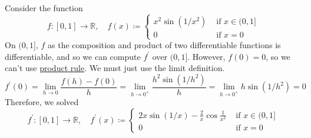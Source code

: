   \begin{example}
    \label{ex:wiggly-sine}
    Consider the function 
    \begin{equation}
      f: [0, 1] \to \mathbb{R}, \quad f(x) \coloneqq \begin{cases} 
        x^2 \sin (1/x^2) & \text{ if } x \in (0, 1] \\
        0 & \text{ if } x = 0
      \end{cases}
    \end{equation}
    On $(0, 1]$, $f$ as the composition and product of two differentiable functions is differentiable, and so we can compute $f^\prime$ over $(0, 1]$. However, $f(0) = 0$, so we can't use \hyperref[thm:product_rule]{product rule}. We must just use the limit definition. 
    \begin{equation}
      f^\prime (0) = \lim_{h \to 0} \frac{f(h) - f(0)}{h} = \lim_{h \to 0^+} \frac{h^2 \sin(1/h^2)}{h} = \lim_{h \to 0^+} h \sin(1/h^2) = 0
    \end{equation}
    Therefore, we solved 
    \begin{equation}
      f^\prime : [0, 1] \to \mathbb{R}, \quad f^\prime (x) \coloneqq \begin{cases} 
        2 x \sin(1/x) - \frac{2}{x} \cos \frac{1}{x^2} & \text{ if } x \in (0, 1] \\ 
        0 & \text{ if } x = 0
      \end{cases}
    \end{equation}

    \begin{center}
\end{center}
\end{example}
